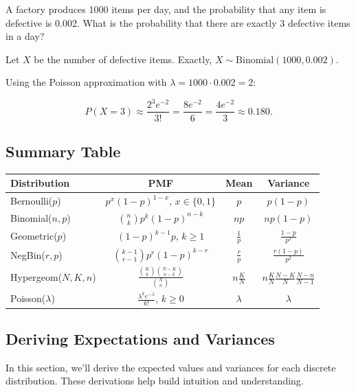 \begin{eg}
A factory produces 1000 items per day, and the probability that any item is defective is 0.002. What is the probability that there are exactly 3 defective items in a day?

Let \(X\) be the number of defective items. Exactly, \(X \sim \text{Binomial}(1000, 0.002)\).

Using the Poisson approximation with \(\lambda = 1000 \cdot 0.002 = 2\):

\[
P(X = 3) \approx \frac{2^3 e^{-2}}{3!} = \frac{8e^{-2}}{6} = \frac{4e^{-2}}{3} \approx 0.180.
\]
\end{eg}

\subsection{Summary Table}

\begin{center}
\renewcommand{\arraystretch}{1.5}
\begin{tabular}{|l|c|c|c|}
\hline
\textbf{Distribution} & \textbf{PMF} & \textbf{Mean} & \textbf{Variance} \\ \hline
Bernoulli(\(p\)) & \(p^x(1-p)^{1-x}\), \(x \in \{0,1\}\) & \(p\) & \(p(1-p)\) \\ \hline
Binomial(\(n,p\)) & \(\binom{n}{k}p^k(1-p)^{n-k}\) & \(np\) & \(np(1-p)\) \\ \hline
Geometric(\(p\)) & \((1-p)^{k-1}p\), \(k \ge 1\) & \(\frac{1}{p}\) & \(\frac{1-p}{p^2}\) \\ \hline
NegBin(\(r,p\)) & \(\binom{k-1}{r-1}p^r(1-p)^{k-r}\) & \(\frac{r}{p}\) & \(\frac{r(1-p)}{p^2}\) \\ \hline
Hypergeom(\(N,K,n\)) & \(\frac{\binom{K}{k}\binom{N-K}{n-k}}{\binom{N}{n}}\) & \(n\frac{K}{N}\) & \(n\frac{K}{N}\frac{N-K}{N}\frac{N-n}{N-1}\) \\ \hline
Poisson(\(\lambda\)) & \(\frac{\lambda^k e^{-\lambda}}{k!}\), \(k \ge 0\) & \(\lambda\) & \(\lambda\) \\ \hline
\end{tabular}
\end{center}

\subsection{Deriving Expectations and Variances}

In this section, we'll derive the expected values and variances for each discrete distribution. These derivations help build intuition and understanding.

